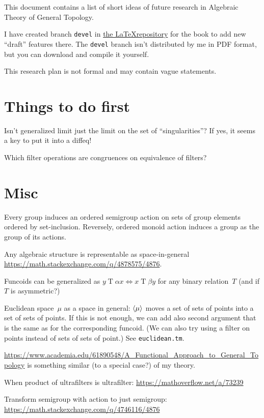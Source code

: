 \documentclass{amsart}
\begin{document}
This document contains a list of short ideas of future research in Algebraic
Theory of General Topology.

I have created branch \texttt{devel} in \href{https://bitbucket.org/portonv/algebraic-general-topology}{the \LaTeX repository} for the book
to add new ``draft'' features there. The \texttt{devel} branch isn't distributed by me in PDF format, but you can download and compile it yourself.

This research plan is not formal and may contain vague statements.

\section{Things to do first}

Isn't generalized limit just the limit on the set of ``singularities''? If yes, it seems a key to put it into a diffeq!

Which filter operations are congruences on
equivalence of filters?

\section{Misc}

Every group induces an ordered semigroup action on sets of group elements ordered by set-inclusion.
Reversely, ordered monoid action induces a group as the group of its actions.

Any algebraic structure is representable as space-in-general \url{https://math.stackexchange.com/q/4878575/4876}.

Funcoids can be generalized as $y\mathrel{T}\alpha x\Leftrightarrow x\mathrel{T}\beta y$ for any binary relation~$T$
(and if $T$ is asymmetric?)

Euclidean space~$\mu$ as a space in general: $\left\langle \mu\right\rangle$ moves a set of sets of points into a set of sets of points.
If this is not enough, we can add also second argument that is the same as for the corresponding funcoid.
(We can also try using a filter on points instead of sets of sets of point.)
See {\tt euclidean.tm}.

\url{https://www.academia.edu/61890548/A_Functional_Approach_to_General_Topology}
is something similar (to a special case?) of my theory.

When product of ultrafilters is ultrafilter:
\url{https://mathoverflow.net/a/73239}

Transform semigroup with action to just semigroup:
\url{https://math.stackexchange.com/q/4746116/4876}
\end{document}
